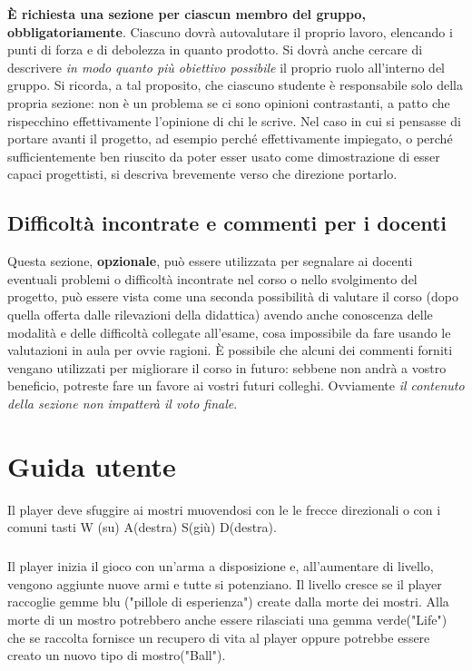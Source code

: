 \documentclass[a4paper,12pt]{report}
\begin{document}
\textbf{È richiesta una sezione per ciascun membro del gruppo, obbligatoriamente}.
%
Ciascuno dovrà autovalutare il proprio lavoro, elencando i punti di forza e di debolezza in quanto prodotto.
Si dovrà anche cercare di descrivere \emph{in modo quanto più obiettivo possibile} il proprio ruolo all'interno del gruppo.
Si ricorda, a tal proposito, che ciascuno studente è responsabile solo della propria sezione: non è un problema se ci sono opinioni contrastanti, a patto che rispecchino effettivamente l'opinione di chi le scrive.
Nel caso in cui si pensasse di portare avanti il progetto, ad esempio perché effettivamente impiegato, o perché sufficientemente ben riuscito da poter esser usato come dimostrazione di esser capaci progettisti, si descriva brevemente verso che direzione portarlo.

\section{Difficoltà incontrate e commenti per i docenti}

Questa sezione, \textbf{opzionale}, può essere utilizzata per segnalare ai docenti eventuali problemi o difficoltà incontrate nel corso o nello svolgimento del progetto, può essere vista come una seconda possibilità di valutare il corso (dopo quella offerta dalle rilevazioni della didattica) avendo anche conoscenza delle modalità e delle difficoltà collegate all'esame, cosa impossibile da fare usando le valutazioni in aula per ovvie ragioni.
%
È possibile che alcuni dei commenti forniti vengano utilizzati per migliorare il corso in futuro: sebbene non andrà a vostro beneficio, potreste fare un favore ai vostri futuri colleghi.
%
Ovviamente \textit{il contenuto della sezione non impatterà il voto finale}.

\appendix
\chapter{Guida utente}

Il player deve sfuggire ai mostri muovendosi con le le frecce direzionali o con i comuni tasti W (su) A(destra) S(giù) D(destra).
\paragraph{}
Il player inizia il gioco con un'arma a disposizione e, all'aumentare di livello, vengono aggiunte nuove armi e tutte si potenziano.
%
Il livello cresce se il player raccoglie gemme blu ("pillole di esperienza") create dalla morte dei mostri.
Alla morte di un mostro potrebbero anche essere rilasciati una gemma verde("Life") che se raccolta fornisce un recupero di vita al player oppure potrebbe essere creato un nuovo tipo di mostro("Ball").
\end{document}
